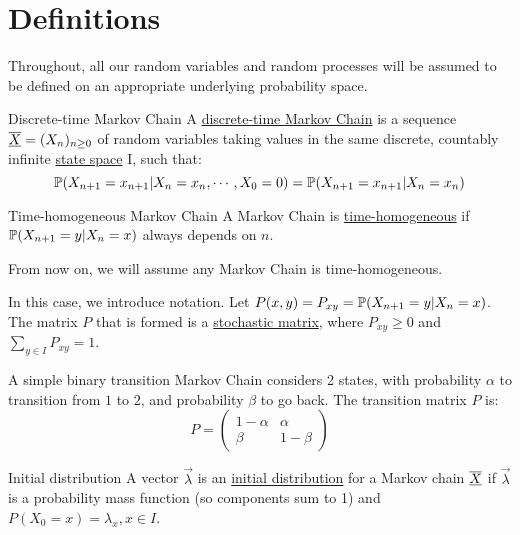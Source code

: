 \documentclass[../Main.tex]{subfiles}
\begin{document}
\section{Definitions}
Throughout, all our random variables and random processes will be assumed to be defined on an appropriate underlying probability space.

\begin{definition}{Discrete-time Markov Chain}
    A \underline{discrete-time Markov Chain} is a sequence $\chain{X} = (X_n)_{n \geq 0}$ of random variables taking values in the same discrete, countably infinite \underline{state space} I, such that:
    \begin{equation*}
        \P(X_{n+1} = x_{n + 1} | X_n = x_n, \cdots, X_0 = 0) = \P(X_{n+1} = x_{n + 1} | X_n = x_n)
    \end{equation*}
\end{definition}
\begin{definition}{Time-homogeneous Markov Chain}
    A Markov Chain is \underline{time-homogeneous} if $\P(X_{n+1} = y | X_n = x)$ always depends on $n$.
\end{definition}
From now on, we will assume any Markov Chain is time-homogeneous.

In this case, we introduce notation. Let $P(x, y) = P_{xy} = \P(X_{n + 1} = y | X_n = x)$. The matrix $P$ that is formed is a \underline{stochastic matrix}, where $P_{xy} \geq 0$ and $\sum_{y \in I} P_{xy} = 1$.

\begin{example}
    A simple binary transition Markov Chain considers 2 states, with probability $\alpha$ to transition from $1$ to $2$, and probability $\beta$ to go back. The transition matrix $P$ is:
    \begin{equation*}
        P = 
        \begin{pmatrix}
            1 - \alpha & \alpha \\
            \beta & 1 - \beta
        \end{pmatrix}
    \end{equation*}
\end{example}
\begin{definition}{Initial distribution}
    A vector $\vec{\lambda}$ is an \underline{initial distribution} for a Markov chain $\chain{X}$ if $\vec{\lambda}$ is a probability mass function (so components sum to 1) and $P(X_0 = x) = \lambda_x, x \in I$.
\end{definition}
\end{document}
